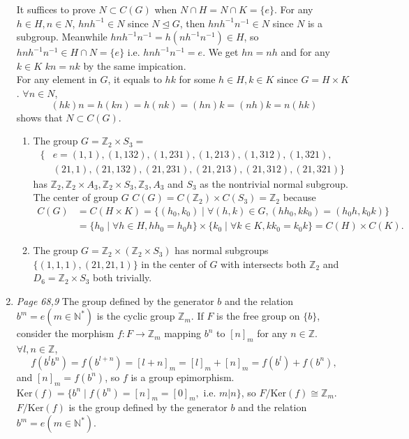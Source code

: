 \documentclass{article}%
\def\zz{\mathbb{Z}}
\def\n{\mathbb{N}}
\begin{document}
\begin{enumerate}
\noindent It suffices to prove $N\subset C(G)$ when $N\cap H=N\cap K=\{e\}$. For any $h\in H,n\in N$, $hnh^{-1}\in N$ since $N\trianglelefteq G$, then $hnh^{-1}n^{-1}\in N$ since $N$ is a subgroup. Meanwhile $hnh^{-1}n^{-1}=h(nh^{-1}n^{-1})\in H$, so $hnh^{-1}n^{-1}\in H\cap N=\{e\}$ i.e. $hnh^{-1}n^{-1}=e$. We get $hn=nh$ and for any $k\in K$ $kn=nk$ by the same impication. 
\\ For any element in $G$, it equals to $hk$ for some $h\in H, k\in K$ since $G=H\times K$. $\forall n\in N$, $$(hk)n=h(kn)=h(nk)=(hn)k=(nh)k=n(hk)$$ shows that $N\subset C(G)$.
\begin{enumerate}
\item
The group $G=\zz_2\times S_3=$ 
\begin{align*}
	\{&e=(1,1),(1,132),(1,231),(1,213),(1,312),(1,321),
	\\ & (21,1),(21,132),(21,231),(21,213),(21,312),(21,321)\}
\end{align*} 
	has $\zz_2, \zz_2\times A_3, \zz_2\times S_3, \zz_3, A_3$ and $S_3$ as the nontrivial normal subgroup. The center of group $G$ $C(G)=C(\zz_2)\times C(S_3)=\zz_2$ because
\begin{align*}
	C(G)&=C(H\times K)=\{(h_0,k_0)\mid \forall (h,k)\in G, (h h_0,k k_0)=(h_0 h,k_0 k)\}
	\\ &=\{h_0\mid \forall h\in H, h h_0=h_0 h\}\times\{k_0\mid \forall k\in K, k k_0=k_0 k\}=C(H)\times C(K).
\end{align*}
\item	
The group $G=\zz_2\times(\zz_2\times S_3)$ has normal subgroups $\{(1,1,1),(21,21,1)\}$ in the center of $G$ with intersects both $\zz_2$ and $D_6=\zz_2\times S_3$ both trivially.	
\end{enumerate}
\endps
\item
\prob
\textit{Page 68,9} The group defined by the generator $b$ and the relation $b^m=e (m\in\n^\ast)$ is the cyclic group $\zz_m$.
\soln
If $F$ is the free group on $\{b\}$, consider the morphism $f:F\to \zz_m$ mapping $b^n$ to $[n]_m$ for any $n\in\zz$. $\forall l,n\in \zz$, $$f(b^l b^n)=f(b^{l+n})=[l+n]_m=[l]_m+[n]_m=f(b^l)+f(b^n),$$ and $[n]_m=f(b^n)$, so $f$ is a group epimorphism. 
\\ $\mathrm{Ker}(f)=\{b^n\mid f(b^n)=[n]_m=[0]_m,\textrm{ i.e. }m|n\}$, so $F/\mathrm{Ker}(f)\cong \zz_m$. $F/\mathrm{Ker}(f)$ is the group defined by the generator $b$ and the relation $b^m=e(m\in\n^\ast)$.
\endps
\end{enumerate}
\end{document}
